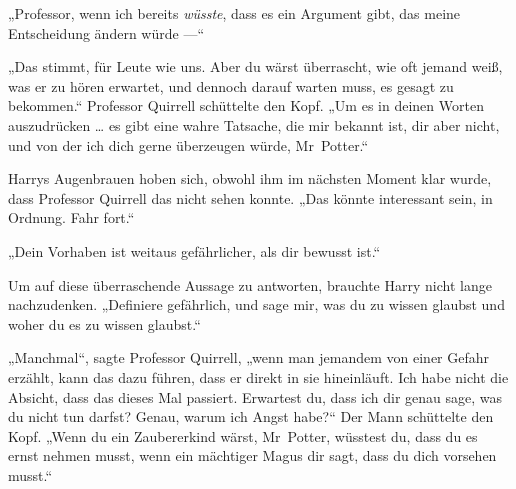 „Professor, wenn ich bereits \emph{wüsste}, dass es ein Argument gibt, das meine Entscheidung ändern würde —“

„Das stimmt, für Leute wie uns. Aber du wärst überrascht, wie oft jemand weiß, was er zu hören erwartet, und dennoch darauf warten muss, es gesagt zu bekommen.“ Professor Quirrell schüttelte den Kopf.
„Um es in deinen Worten auszudrücken … es gibt eine wahre Tatsache, die mir bekannt ist, dir aber nicht, und von der ich dich gerne überzeugen würde, Mr~Potter.“

Harrys Augenbrauen hoben sich, obwohl ihm im nächsten Moment klar wurde, dass Professor Quirrell das nicht sehen konnte.
„Das könnte interessant sein, in Ordnung. Fahr fort.“

„Dein Vorhaben ist weitaus gefährlicher, als dir bewusst ist.“

Um auf diese überraschende Aussage zu antworten, brauchte Harry nicht lange nachzudenken.
„Definiere gefährlich, und sage mir, was du zu wissen glaubst und woher du es zu wissen glaubst.“

„Manchmal“, sagte Professor Quirrell, „wenn man jemandem von einer Gefahr erzählt, kann das dazu führen, dass er direkt in sie hineinläuft. Ich habe nicht die Absicht, dass das dieses Mal passiert. Erwartest du, dass ich dir genau sage, was du nicht tun darfst? Genau, warum ich Angst habe?“ Der Mann schüttelte den Kopf.
„Wenn du ein Zaubererkind wärst, Mr~Potter, wüsstest du, dass du es ernst nehmen musst, wenn ein mächtiger Magus dir sagt, dass du dich vorsehen musst.“

